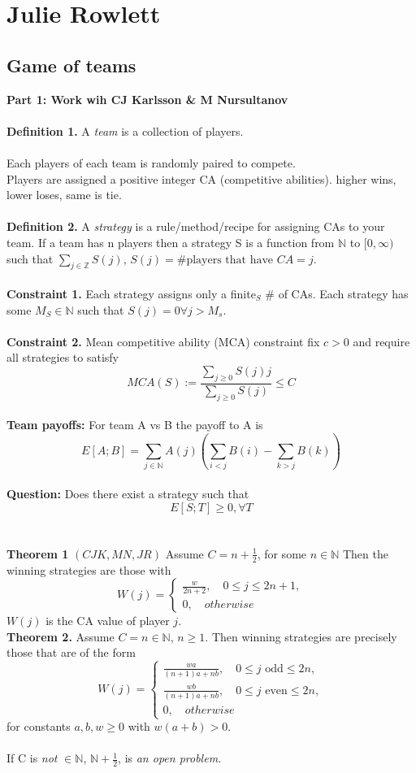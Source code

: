 \chapter{Julie Rowlett}
\section{Game of teams}
\textbf{Part 1: Work wih CJ Karlsson \& M Nursultanov}\\\\
\textbf{Definition 1.} A \textit{team} is a collection of players.\\\\
Each players of each team is randomly paired to compete.\\
Players are assigned a positive integer CA (competitive abilities). higher wins, lower loses, same is tie.\\\\
\textbf{Definition 2.} A \textit{strategy} is a rule/method/recipe for assigning CAs to your team.
If a team has n players then a strategy S is a function from $\mathbb{N}$ to $[0,\infty)$ such that $\sum_{j\in \mathbb{Z}}S(j)$, $S(j)=\text{\# players that have } CA=j$.\\
\noindent\\
\textbf{Constraint 1.} Each strategy assigns only a finite$_S$ \# of CAs.
Each strategy has some $M_S\in \mathbb{N}$ such that $S(j)=0 \forall j > M_s$. \\
\\
\textbf{Constraint 2.} Mean competitive ability (MCA) constraint fix $c>0$ and require all strategies to satisfy 
$$MCA(S):=\frac{\sum_{j\geq 0}S(j)j}{\sum_{j\geq 0}S(j)}\leq C$$
\\
\textbf{Team payoffs:} For team A vs B the payoff to A is $$E[A;B]=\sum_{j\in \mathbb{N}}A(j)(\sum_{i<j}B(i)-\sum_{k>j}B(k))$$
\\
\textbf{Question:} Does there exist a strategy such that $$E[S;T]\geq 0, \forall T$$\\\\
\textbf{Theorem 1} $(CJK,MN,JR)$ Assume $C=n+\frac{1}{2}$, for some $n\in \mathbb{N}$ Then the winning strategies are those with 
\[W(j)=\begin{cases}
	\frac{w}{2n+2}, \quad 0\leq j \leq 2n+1,\\
	0, \quad otherwise
\end{cases}
\]
$W(j)$ is the CA value of player $j$.
\\
\textbf{Theorem 2.} Assume $C=n \in \mathbb{N}$, $n\geq 1$. Then winning strategies are precisely those that are of  the form 
\[W(j)=\begin{cases}
	\frac{wa}{(n+1)a+nb}, \quad 0\leq j \text{ odd} \leq 2n,\\
	\frac{wb}{(n+1)a+nb}, \quad 0\leq j \text{ even} \leq 2n,\\
	0, \quad otherwise
\end{cases}
\]
for constants $a,b,w\geq 0$ with $w(a+b)>0$.\\\\
If C is \textit{not} $\in \mathbb{N}$, $\mathbb{N}+\frac{1}{2}$, is \textit{an open problem.}

